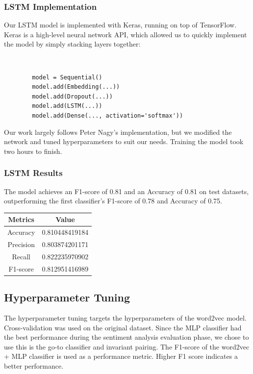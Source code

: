 \documentclass{sig-alternate-05-2015}
\begin{document}
	\subsubsection{LSTM Implementation}
	Our LSTM model is implemented with Keras, running on top of TensorFlow. Keras is a high-level neural network API, which allowed us to quickly implement the model by simply stacking layers together:
	{\tt \small
		\begin{verbatim}
		model = Sequential()
		model.add(Embedding(...))
		model.add(Dropout(...))
		model.add(LSTM(...))
		model.add(Dense(..., activation='softmax'))
		\end{verbatim}
	}
	
	Our work largely follows Peter Nagy's implementation\cite{peter}, but we modified the network and tuned hyperparameters to suit our needs. Training the model took two hours to finish.
	
	\subsubsection{LSTM Results}
	The model achieves an F1-score of 0.81 and an Accuracy of 0.81 on test datasets, outperforming the first classifier's F1-score of 0.78 and Accuracy of 0.75.  \\
	
	\begin{center}
		\begin{tabular}{|c|c|}
			
			\hline
			Metrics & Value \\
			\hline
			Accuracy & 0.810448419184 \\
			Precision & 0.803874201171 \\
			Recall & 0.822235970902 \\
			F1-score & 0.812951416989 \\
			\hline
		\end{tabular}
	\end{center}
	
	\subsection{Hyperparameter Tuning}
	The hyperparameter tuning targets the hyperparameters of the word2vec model. Cross-validation was used on the original dataset. Since the MLP classifier had the best performance during the sentiment analysis evaluation phase, we chose to use this is the go-to classifier and invariant pairing. The F1-score of the word2vec + MLP classifier is used as a performance metric. Higher F1 score indicates a better performance. 
\end{document}
